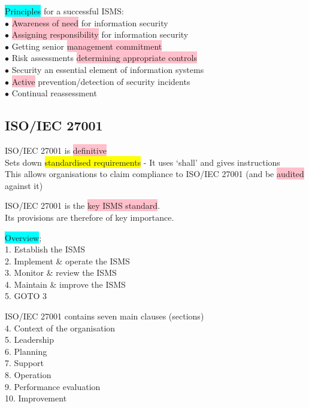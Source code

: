 \documentclass[tikz,border=10pt]{project_plan}
\newcommand{\bulletPoint}{\hspace{-3.1pt}$\bullet$ \hspace{5pt}}
\begin{document}
\newpage

\colorbox{cyan}{Principles} for a successful ISMS:\\
\bulletPoint \colorbox{pink}{Awareness of need} for information security\\
\bulletPoint \colorbox{pink}{Assigning responsibility} for information security\\
\bulletPoint Getting senior \colorbox{pink}{management commitment}\\
\bulletPoint Risk assessments \colorbox{pink}{determining appropriate controls}\\
\bulletPoint Security an essential element of information systems\\
\bulletPoint \colorbox{pink}{Active} prevention/detection of security incidents\\
\bulletPoint Continual reassessment

\subsection{ISO/IEC 27001}

ISO/IEC 27001 is \colorbox{pink}{definitive}\\
Sets down \colorbox{yellow}{standardised requirements} - It uses ‘shall’ and gives instructions\\
This allows organisations to claim compliance to ISO/IEC 27001 (and be \colorbox{pink}{audited} against it)

ISO/IEC 27001 is the \colorbox{pink}{key ISMS standard}.\\
Its provisions are therefore of key importance.

\colorbox{cyan}{Overview};\\
1. Establish the ISMS\\
2. Implement \& operate the ISMS\\
3. Monitor \& review the ISMS\\
4. Maintain \& improve the ISMS\\
5. GOTO 3

ISO/IEC 27001  contains seven main clauses (sections)\\
4. Context of the organisation\\
5. Leadership\\
6. Planning\\
7. Support\\
8. Operation\\
9. Performance evaluation\\
10. Improvement
\end{document}
